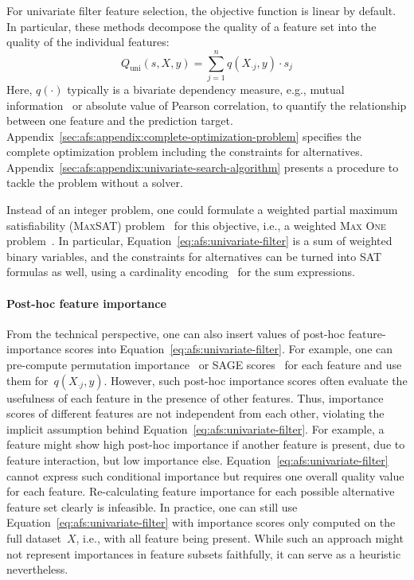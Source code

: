 \documentclass{article}
\theoremstyle{definition}
\begin{document}
For univariate filter feature selection, the objective function is linear by default.
In particular, these methods decompose the quality of a feature set into the quality of the individual features:
%
\begin{equation}
	Q_{\text{uni}}(s,X,y) = \sum_{j=1}^{n} q(X_{\cdot{}j},y) \cdot s_j
	\label{eq:afs:univariate-filter}
\end{equation}
%
Here, $q(\cdot)$ typically is a bivariate dependency measure, e.g., mutual information~\cite{kraskov2004estimating} or absolute value of Pearson correlation, to quantify the relationship between one feature and the prediction target.
Appendix~\ref{sec:afs:appendix:complete-optimization-problem} specifies the complete optimization problem including the constraints for alternatives.
Appendix~\ref{sec:afs:appendix:univariate-search-algorithm} presents a procedure to tackle the problem without a solver.

Instead of an integer problem, one could formulate a weighted partial maximum satisfiability (\textsc{MaxSAT}) problem~\cite{bacchus2021maximum, li2021maxsat} for this objective, i.e., a weighted \textsc{Max One} problem~\cite{khanna1997complete}.
In particular, Equation~\ref{eq:afs:univariate-filter} is a sum of weighted binary variables, and the constraints for alternatives can be turned into SAT formulas as well, using a cardinality encoding~\cite{sinz2005towards} for the sum expressions.

\paragraph{Post-hoc feature importance}

From the technical perspective, one can also insert values of post-hoc feature-importance scores into Equation~\ref{eq:afs:univariate-filter}.
For example, one can pre-compute permutation importance~\cite{breiman2001random} or SAGE scores~\cite{covert2020understanding} for each feature and use them for~$q(X_{\cdot{}j},y)$.
However, such post-hoc importance scores often evaluate the usefulness of each feature in the presence of other features.
Thus, importance scores of different features are not independent from each other, violating the implicit assumption behind Equation~\ref{eq:afs:univariate-filter}.
For example, a feature might show high post-hoc importance if another feature is present, due to feature interaction, but low importance else.
Equation~\ref{eq:afs:univariate-filter} cannot express such conditional importance but requires one overall quality value for each feature.
Re-calculating feature importance for each possible alternative feature set clearly is infeasible.
In practice, one can still use Equation~\ref{eq:afs:univariate-filter} with importance scores only computed on the full dataset~$X$, i.e., with all feature being present.
While such an approach might not represent importances in feature subsets faithfully, it can serve as a heuristic nevertheless.
\end{document}
